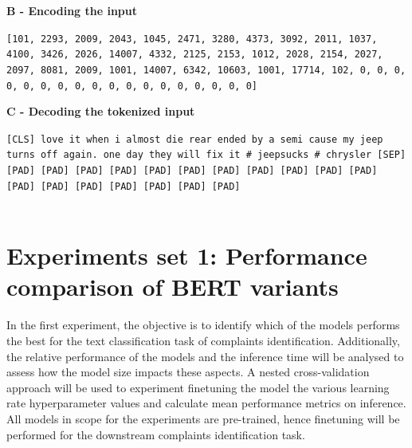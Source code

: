 \textbf{B - Encoding the input}\newline

\begin{adjustbox}{minipage={\textwidth},fbox}
    \texttt{[101, 2293, 2009, 2043, 1045, 2471, 3280, 4373, 3092, 2011, 1037, 4100, 3426,
                2026, 14007, 4332, 2125, 2153, 1012, 2028, 2154, 2027, 2097, 8081, 2009, 1001,
                14007, 6342, 10603, 1001, 17714, 102, 0, 0, 0, 0, 0, 0, 0, 0, 0, 0, 0, 0, 0,
                0, 0, 0, 0, 0]}
\end{adjustbox} \newline\newline

\textbf{C - Decoding the tokenized input}\newline

\begin{adjustbox}{minipage={\textwidth},fbox}
    \texttt{[CLS] love it when i almost die rear ended by a semi cause my jeep turns off 
again. one day they will fix it \# jeepsucks \# chrysler [SEP] [PAD] [PAD] [PAD] 
[PAD] [PAD] [PAD] [PAD] [PAD] [PAD] [PAD] [PAD] [PAD] [PAD] [PAD] [PAD] [PAD] 
[PAD] [PAD]}
\end{adjustbox}\\ \\

\section{Experiments set 1: Performance comparison of BERT variants}
In the first experiment, the objective is to identify which of the models performs the best for the text classification task of complaints identification. Additionally, the relative performance of the models and the inference time will be analysed to assess how the model size impacts these aspects. A nested cross-validation approach will be used to experiment finetuning the model the various learning rate hyperparameter values and calculate mean performance metrics on inference. All models in scope for the experiments are pre-trained, hence finetuning will be performed for the downstream complaints identification task.\\


